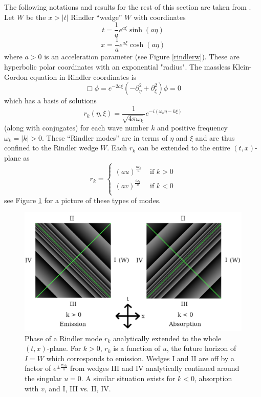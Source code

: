 \documentclass[12pt,a4paper]{article}
\begin{document}
The following notations and results for the rest of this section are taken from \cite{Frodden}. Let $W$ be the $x>|t|$ Rindler ``wedge'' $W$ with coordinates
\begin{equation}
  t = \frac{1}{a}e^{a\xi}\sinh{(a\eta)}
\label{sinh}
\end{equation}
\begin{equation}
x = \frac{1}{a}e^{a\xi}\cosh{(a\eta)}
\end{equation}
where $a>0$ is an acceleration parameter (see Figure \ref{rindlerw}). These are hyperbolic polar coordinates with an exponential "radius".  The massless Klein-Gordon equation in Rindler coordinates is
\begin{equation}
  \Box \phi = e^{-2a \xi}(-\partial_\eta^2 + \partial_\xi^2) \phi = 0
\end{equation}
which has a basis of solutions 
\begin{equation}
 r_k(\eta,\xi) = \frac{1}{\sqrt{4 \pi \omega_k}} e^{-i(\omega_k \eta -k \xi)}
\end{equation}
(along with conjugates) for each wave number $k$ and positive frequency $\omega_k = |k| > 0$.  These ``Rindler modes'' are in terms of $\eta$ and $\xi$ and are thus confined to the Rindler wedge $W$.  Each $r_k$ can be extended to the entire $(t,x)$-plane as
\begin{equation}
  r_k = \left\{\begin{array}{cc}
      {(au)}^{\frac{i\omega_k}{a}} & \text{ if } k > 0 \\
      {(av)}^{\frac{i\omega_k}{a}} & \text{ if } k < 0 \\  
    \end{array}\right.
\end{equation}
see Figure \ref{analytic} for a picture of these types of modes.
\begin{figure}[h]
  \centering
  \captionsetup{width=0.8\linewidth}
\includegraphics[scale=0.3]{analytic.png}
\caption{Phase of a Rindler mode $r_k$ analytically extended to the whole $(t,x)$-plane. For $k>0$, $r_k$ is a function of $u$, the future horizon of $I = W$ which corrosponds to emission.  Wedges I and II are off by a factor of $e^{\pm \frac{\pi \omega_k}{a}}$ from wedges III and IV analytically continued around the singular $u=0$.  A similar situation exists for $k<0$, absorption with $v$, and I, III vs. II, IV.}
\label{analytic}
\end{figure}
\end{document}
